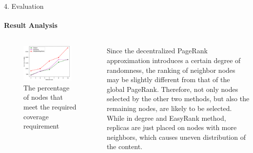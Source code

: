 \documentclass{beamer}		%
\begin{document}
\begin{frame}{4. Evaluation}
\framesubtitle{Result Analysis}
\begin{columns}
\begin{figure}
    \centering
    \includegraphics[width=0.9\textwidth]{imgs/Figure4.png}
    \caption{The percentage of nodes that meet the required coverage requirement}
\end{figure}
Since the decentralized PageRank approximation introduces a certain degree of randomness, the ranking of neighbor nodes may be slightly different from that of the global PageRank. Therefore, not only nodes selected by the other two methods, but also the remaining nodes, are likely to be selected. While in degree and EasyRank method, replicas are just placed on nodes with more neighbors, which causes uneven distribution of the content.
\end{columns}
\end{frame}
\end{document}
